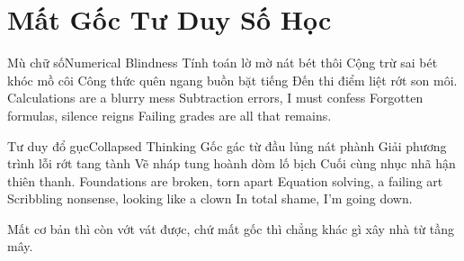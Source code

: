 \chapter{Mất Gốc Tư Duy Số Học}

\begin{tutuyetbox}{Mù chữ số}{Numerical Blindness}
Tính toán lờ mờ nát bét thôi
Cộng trừ sai bét khóc mồ côi
Công thức quên ngang buồn bặt tiếng
Đến thi điểm liệt rớt son môi.
\tcblower
Calculations are a blurry mess 
Subtraction errors, I must confess 
Forgotten formulas, silence reigns 
Failing grades are all that remains.
\end{tutuyetbox}

\begin{tutuyetbox}{Tư duy đổ gục}{Collapsed Thinking}
Gốc gác từ đầu lủng nát phành
Giải phương trình lỗi rớt tang tành
Vẽ nháp tung hoành dòm lố bịch
Cuối cùng nhục nhã hận thiên thanh.
\tcblower
Foundations are broken, torn apart 
Equation solving, a failing art 
Scribbling nonsense, looking like a clown 
In total shame, I'm going down.
\end{tutuyetbox}

\begin{ghichu}
Mất cơ bản thì còn vớt vát được, chứ mất gốc thì chẳng khác gì xây nhà từ tầng mây.
\end{ghichu}